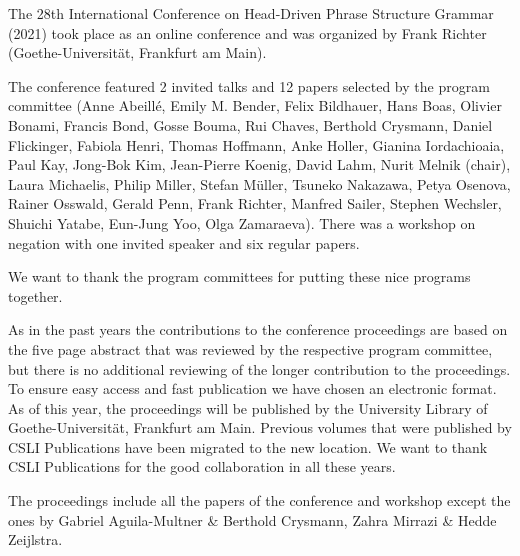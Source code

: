 The 28th International Conference on Head-Driven Phrase Structure Grammar (2021) took place as an
online conference and was organized by Frank Richter (Goethe-Universität, Frankfurt am Main).


The conference featured 2 invited talks and 12 papers selected by the program committee 
(Anne Abeillé, 
    Emily M. Bender, 
    Felix Bildhauer, 
    Hans Boas, 
    Olivier Bonami, 
    Francis Bond, 
    Gosse Bouma, 
    Rui Chaves, 
    Berthold Crysmann, 
    Daniel Flickinger, 
    Fabiola Henri, 
    Thomas Hoffmann, 
    Anke Holler, 
    Gianina Iordachioaia, 
    Paul Kay, 
    Jong-Bok Kim, 
    Jean-Pierre Koenig, 
    David Lahm, 
    Nurit Melnik (chair),
    Laura Michaelis, 
    Philip Miller, 
    Stefan Müller, 
    Tsuneko Nakazawa, 
    Petya Osenova, 
    Rainer Osswald, 
    Gerald Penn, 
    Frank Richter, 
    Manfred Sailer, 
    Stephen Wechsler, 
    Shuichi Yatabe,
    Eun-Jung Yoo, 
    Olga Zamaraeva). There was a workshop on negation with one invited speaker and six regular papers.


We want to thank the program committees for putting these nice programs together.

 

As in the past years the contributions to the conference proceedings are based on the five page abstract
that was reviewed by the respective 
program committee, but there is no additional reviewing of the
longer contribution to the proceedings. To ensure easy access and fast publication we have chosen an
electronic format. As of this year, the proceedings will be published by the University Library of
Goethe-Universität, Frankfurt am Main. Previous volumes that were published by CSLI Publications
have been migrated to the new location. We want to thank CSLI Publications for the good
collaboration in all these years.

The proceedings include all the papers of the conference and workshop except the ones by Gabriel
Aguila-Multner \& Berthold Crysmann, Zahra Mirrazi \& Hedde Zeijlstra.


